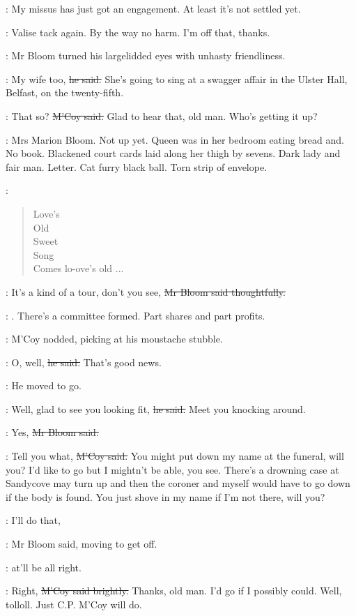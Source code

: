 \mccoy:
My missus has just got an engagement.
At least it's not settled yet.

\BloomInt:
Valise tack again.
By the way no harm.
I'm off that, thanks.

:
Mr Bloom turned his largelidded eyes
with unhasty friendliness.

\Bloom:
My wife too,
\sout{he said.}
She's going to sing at a swagger affair in the Ulster Hall, Belfast,
on the twenty-fifth.

\mccoy:
That so?
\sout{M'Coy said.}
Glad to hear that, old man.
Who's getting it up?

\BloomInt:
Mrs Marion Bloom.
Not up yet.
Queen was in her bedroom eating bread and.
No book.
Blackened court cards laid along her thigh by sevens.
Dark lady and fair man.
Letter.
Cat furry black ball.
Torn strip of envelope.

\BloomInt:
\begin{verse}
    Love's \\
    Old \\
    Sweet \\
    Song \\
    Comes lo-ove's old ...
\end{verse}

\Bloom:
It's a kind of a tour,
don't you see,
\sout{Mr Bloom said thoughtfully.}

\BloomInt:
.
There's a committee formed.
Part shares and part profits.

:
M'Coy nodded,
picking at his moustache stubble.

\mccoy:
O, well,
\sout{he said.}
That's good news.

:
He moved to go.

\mccoy:
Well, glad to see you looking fit,
\sout{he said.}
Meet you knocking around.

\Bloom:
Yes,
\sout{Mr Bloom said.}

\mccoy:
Tell you what,
\sout{M'Coy said.}
You might put down my name at the funeral,
will you?
I'd like to go but I mightn't be able, you see.
There's a drowning case at Sandycove may turn up
and then the coroner and myself would have to go down
if the body is found.
You just shove in my name if I'm not there,
will you?

\Bloom:
I'll do that,

:
Mr Bloom said,
moving to get off.

\Bloom:
at'll be all right.

\mccoy:
Right,
\sout{M'Coy said brightly.}
Thanks, old man.
I'd go if I possibly could.
Well, tolloll.
Just C.P. M'Coy will do.

